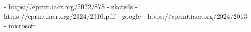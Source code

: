 - https://eprint.iacr.org/2022/878 - zkcreds
- https://eprint.iacr.org/2024/2010.pdf - google
- https://eprint.iacr.org/2024/2013 - microsoft

